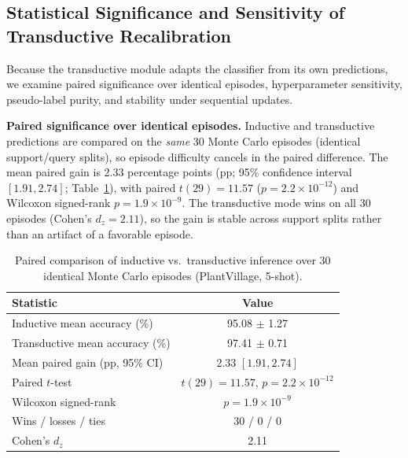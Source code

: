 \subsection{Statistical Significance and Sensitivity of Transductive Recalibration}
\label{sec:transductive_validation}
Because the transductive module adapts the classifier from its own predictions, we examine paired significance over identical episodes, hyperparameter sensitivity, pseudo-label purity, and stability under sequential updates.

\textbf{Paired significance over identical episodes.} Inductive and transductive predictions are compared on the \emph{same} 30 Monte Carlo episodes (identical support/query splits), so episode difficulty cancels in the paired difference. The mean paired gain is 2.33 percentage points (pp; 95\% confidence interval $[1.91, 2.74]$; Table~\ref{tab:paired_test}), with paired $t(29) = 11.57$ ($p = 2.2 \times 10^{-12}$) and Wilcoxon signed-rank $p = 1.9 \times 10^{-9}$. The transductive mode wins on all 30 episodes (Cohen's $d_z = 2.11$), so the gain is stable across support splits rather than an artifact of a favorable episode.

\begin{table}[htbp]
\caption{Paired comparison of inductive vs.\ transductive inference over 30 identical Monte Carlo episodes (PlantVillage, 5-shot).}
\label{tab:paired_test}
\centering

\footnotesize
\setlength{\tabcolsep}{4pt}
\begin{tabular*}{\columnwidth}{@{\extracolsep{\fill}}lc}
\toprule
\textbf{Statistic} & \textbf{Value} \\
\midrule
Inductive mean accuracy (\%) & 95.08 $\pm$ 1.27 \\
Transductive mean accuracy (\%) & 97.41 $\pm$ 0.71 \\
Mean paired gain (pp, 95\% CI) & 2.33 $[1.91, 2.74]$ \\
Paired $t$-test & $t(29)=11.57$, $p=2.2\times10^{-12}$ \\
Wilcoxon signed-rank & $p=1.9\times10^{-9}$ \\
Wins / losses / ties & 30 / 0 / 0 \\
Cohen's $d_z$ & 2.11 \\
\bottomrule
\end{tabular*}
\end{table}

